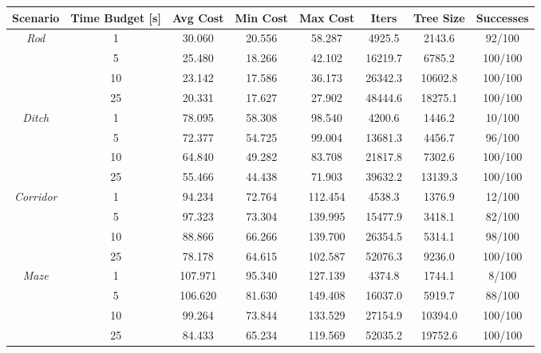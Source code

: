\begin{table}
    \centering
    \begin{tabular}{*{8}{c}}
         Scenario & Time Budget [s] & Avg Cost & Min Cost & Max Cost & Iters & Tree Size & Successes \\
        \hline
        \multirow{4}{*}{\textit{Rod}} & 1 & 30.060 & 20.556 & 58.287 & 4925.5 & 2143.6 & 92/100 \\
         & 5 & 25.480 & 18.266 & 42.102 & 16219.7 & 6785.2 & 100/100 \\
         & 10 & 23.142 & 17.586 & 36.173 & 26342.3 & 10602.8 & 100/100 \\
         & 25 & 20.331 & 17.627 & 27.902 & 48444.6 & 18275.1 & 100/100 \\
        
        \hline                                                          
        \multirow{4}{*}{\textit{Ditch}} & 1 & 78.095 & 58.308 & 98.540 & 4200.6 & 1446.2 & 10/100 \\
         & 5 & 72.377 & 54.725 & 99.004 & 13681.3 & 4456.7 & 96/100 \\
         & 10 & 64.840 & 49.282 & 83.708 & 21817.8 & 7302.6 & 100/100 \\
         & 25 & 55.466 & 44.438 & 71.903 & 39632.2 & 13139.3 & 100/100 \\  
        
        \hline                                                            
        \multirow{4}{*}{\textit{Corridor}} & 1 & 94.234 & 72.764 & 112.454 & 4538.3 & 1376.9 & 12/100 \\
         & 5 & 97.323 & 73.304 & 139.995 & 15477.9 & 3418.1 & 82/100 \\
         & 10 & 88.866 & 66.266 & 139.700 & 26354.5 & 5314.1 & 98/100 \\
         & 25 & 78.178 & 64.615 & 102.587 & 52076.3 & 9236.0 & 100/100 \\
        
        \hline                                                                      
        \multirow{4}{*}{\textit{Maze}} & 1 & 107.971 & 95.340 & 127.139 & 4374.8 & 1744.1 & 8/100 \\
         & 5 & 106.620 & 81.630 & 149.408 & 16037.0 & 5919.7 & 88/100 \\
         & 10 & 99.264 & 73.844 & 133.529 & 27154.9 & 10394.0 & 100/100 \\
         & 25 & 84.433 & 65.234 & 119.569 & 52035.2 & 19752.6 & 100/100 \\
        

\end{tabular}
\end{table}
